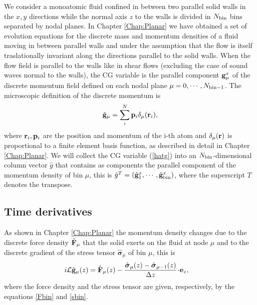 \documentclass[b5paper,openright,10pt]{book}
\newcommand{\esc}{\!\cdot\!}
\begin{document}
We consider a monoatomic fluid  confined in between two parallel solid
walls in the  $x,y$ directions while the normal axis  $z$ to the
walls is divided in $N_{\rm bin}$  bins separated by nodal planes.  In Chapter \ref{Chap:Planar}
we  have obtained a set of evolution  equations for the
discrete  mass and  momentum densities  of a  fluid moving  in between
parallel  walls and  under  the  assumption that  the  flow is  itself
traslationally invariant  along the  directions parallel to  the solid
walls.  When  the flow field  is parallel to  the walls like  in shear
flows (excluding the case of sound  waves normal to the walls), the CG
variable is the  parallel component ${\bf g}^x_\mu$  of the discrete
momentum field defined on each nodal plane $\mu=0,\cdots,N_{\rm bin-1}$.
The microscopic definition of the discrete momentum is
\begin{align}
  \hat{\bf g}_\mu=\sum_i^N{\bf p}_i\delta_\mu({\bf r}_i),
\label{hatg}
\end{align}
where ${\bf r}_i,{\bf p}_i$ are the  position and momentum of the i-th
atom and  $\delta_\mu({\bf r})$  is proportional  to a  finite element
basis  function, as  described in  detail in  Chapter \ref{Chap:Planar}.
We will
collect   the    CG   variable    (\ref{hatg})   into    an   $N_{\rm
  bin}$-dimensional   column  vector   $\hat{g}$   that  contains   as
components  the parallel  component  of the  momentum  density of  bin
$\mu$,  this  is $\hat{g}^T=(\hat{\bf g}^x_1,\cdots,\hat{\bf g}^x_{\rm bin})$,  where  the
superscript $T$ denotes the transpose.



\subsection{Time derivatives}
As shown  in Chapter \ref{Chap:Planar}
the momentum  density changes due  to the
discrete force density $ \hat{\bf F}_\mu$ that the solid exerts on the
fluid at node $\mu$ and to  the discrete gradient of the stress tensor
$\hat{ \boldsymbol{\sigma}}_{\mu}$ of bin $\mu$, this is
\begin{align}
  i{\cal L}\hat{\bf g}_\mu(z) &=\hat{\bf F}_\mu(z)-\frac{\hat{\boldsymbol{\sigma}}_\mu(z)-\hat{\boldsymbol{\sigma}}_{\mu-1}(z)}{\Delta z}\esc{\bf e}_z,
\label{equationivalenceSlipCH}
\end{align}
where the force density and the stress tensor are given, respectively, by the equations \ref{Fbin} and \ref{sbin}.
\end{document}
